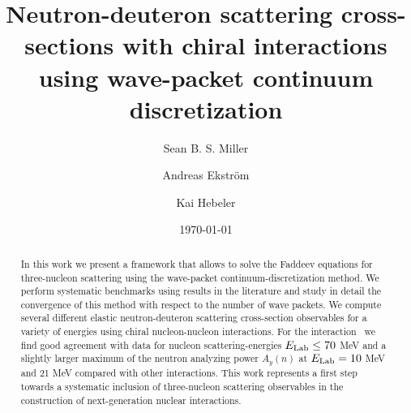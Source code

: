 \documentclass[aps,prc,showpacs,twocolumn,floatfix,nobibnotes,nofootinbib,amsmath,amssymb,longbibliography]{revtex4-2}
\begin{document}
\title{Neutron-deuteron scattering cross-sections with chiral \NN{} interactions using wave-packet continuum discretization}

\date{\today}
\author{Sean B. S. Miller}
\author{Andreas Ekstr\"om}
\author{Kai Hebeler}

\begin{abstract}
In this work we present a framework that allows to solve the Faddeev
equations for three-nucleon scattering using the wave-packet
continuum-discretization method. We perform systematic benchmarks
using results in the literature and study in detail the convergence of
this method with respect to the number of wave packets. We compute
several different elastic neutron-deuteron scattering cross-section
observables for a variety of energies using chiral nucleon-nucleon
interactions. For the interaction \NNLOopt~we find good agreement with
data for nucleon scattering-energies $E_\text{Lab} \leq 70$ MeV and a
slightly larger maximum of the neutron analyzing power $A_y(n)$ at
$E_\text{Lab} = 10$ MeV and 21 MeV compared with other interactions. This
work represents a first step towards a systematic inclusion of
three-nucleon scattering observables in the construction of
next-generation nuclear interactions.
\end{abstract}

\maketitle
\end{document}
